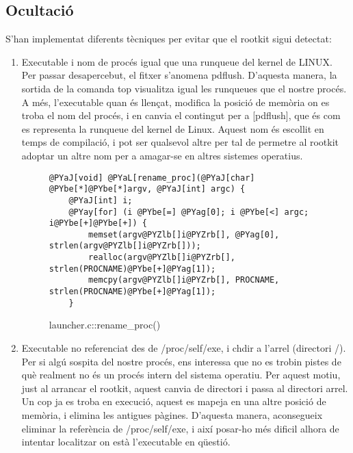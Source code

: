 \subsection{Ocultació}
S'han implementat diferents tècniques per evitar que el  rootkit sigui detectat:
\begin{enumerate}
\item Executable i nom de procés igual que una runqueue del kernel de LINUX. \\
Per passar desapercebut, el fitxer s'anomena pdflush. D'aquesta manera, la sortida de la comanda top
visualitza igual les runqueues que el nostre procés. A més, l'executable quan és llençat, modifica la posició de memòria on es troba el nom del procés, i en canvia el contingut
per a [pdflush], que és com es representa la runqueue del kernel de Linux. Aquest nom és escollit en temps de compilació, i pot ser qualsevol altre per tal de permetre al
rootkit adoptar un altre nom per a amagar-se en altres sistemes operatius.

\begin{figure}[htp]
\begin{Verbatim}[commandchars=@\[\]]
@PYaJ[void] @PYaL[rename_proc](@PYaJ[char] @PYbe[*]@PYbe[*]argv, @PYaJ[int] argc) {
    @PYaJ[int] i;
    @PYay[for] (i @PYbe[=] @PYag[0]; i @PYbe[<] argc; i@PYbe[+]@PYbe[+]) {
        memset(argv@PYZlb[]i@PYZrb[], @PYag[0], strlen(argv@PYZlb[]i@PYZrb[]));
        realloc(argv@PYZlb[]i@PYZrb[], strlen(PROCNAME)@PYbe[+]@PYag[1]);
        memcpy(argv@PYZlb[]i@PYZrb[], PROCNAME, strlen(PROCNAME)@PYbe[+]@PYag[1]);
    }
\end{Verbatim}
    \caption{launcher.c::rename\_proc()}
    \label{fig:laucner_rename_proc}
\end{figure}

\item Executable no referenciat des de /proc/self/exe, i chdir a l'arrel (directori /). \\
Per si algú sospita del nostre procés, ens interessa que no es trobin pistes de què realment no és un procés intern del sistema operatiu. Per aquest motiu, just al arrancar el rootkit,
aquest canvia de directori i passa al directori arrel. Un cop ja es troba en execució, aquest es mapeja en una altre posició de memòria, i elimina les antigues pàgines. D'aquesta manera, 
aconsegueix eliminar la referència de /proc/self/exe, i així posar-ho més dificil alhora de intentar localitzar on està l'executable en qüestió. 


\end{enumerate}
